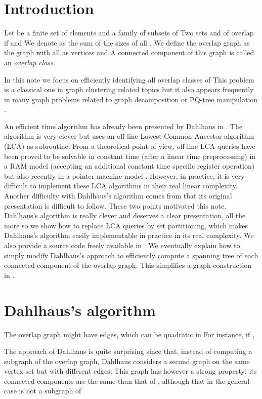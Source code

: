 \documentclass{llncs}
\begin{document}
\section{Introduction}  
\label{sec:intro}  

Let  be a finite set of  elements and  a family of  subsets of 
Two sets  and  of  overlap if   and  We denote  as the sum of the sizes of all
. We define the overlap graph  as the
graph with all  as vertices and  A connected
component of this graph is called an {\em overlap class.}

In this note we focus on efficiently identifying all overlap classes of
 This problem is a classical one in graph clustering
related topics but it also appears frequently in many graph problems
related to graph decomposition \cite{Dahlhaus00} or PQ-tree
manipulation \cite{McConnell04}.

An efficient  time algorithm has already been
presented by Dahlhaus in \cite{Dahlhaus00}. The algorithm is very
clever but uses an off-line Lowest Common Ancestor algorithm (LCA) as
subroutine. From a theoretical point of view, off-line LCA queries
have been proved to be solvable in constant time (after a linear time
preprocessing) in a RAM model (accepting an additional constant time
specific register operation) but also recently in a pointer machine
model \cite{BKRW98}. However, in practice, it is very difficult to
implement these LCA algorithms in their real linear
complexity. Another difficulty with Dahlhaus's algorithm comes from
that its original presentation is difficult to follow. These two
points motivated this note. Dahlhaus's algorithm is really clever and
deserves a clear presentation, all the more so we show how to replace
LCA queries by set partitioning, which makes Dahlhaus's algorithm
easily implementable in practice in its real complexity. We also
provide a source code freely available in \cite{OurImpl07}. We
eventually explain how to simply modify Dahlhaus's approach to
efficiently compute a spanning tree of each connected component of the
overlap graph. This simplifies a graph construction in
\cite{McConnell04}.

\section{Dahlhaus's algorithm}
\label{dahlhausalgorithm}

The overlap graph  might have  edges,
which can be quadratic in  For instance, if ,


The approach of Dahlhaus is quite surprising since that, instead of
computing a subgraph of the overlap graph, Dahlhaus considers
a second graph  on the same vertex set but with
different edges. This graph has however a strong property: its
connected components are the same than that of ,
although that in the general case  is not a subgraph
of 
 
\end{document}

